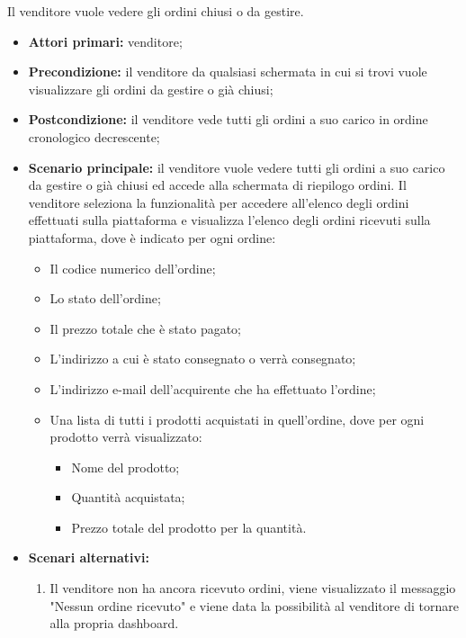 \label{visualizzazione-ordini-in-gestione}

Il venditore vuole vedere gli ordini chiusi o da gestire.
\begin{itemize}
    \item \textbf{Attori primari:} venditore;
    \item \textbf{Precondizione:} il venditore da qualsiasi schermata in cui si trovi vuole visualizzare gli ordini da gestire o già chiusi;
    \item \textbf{Postcondizione:} il venditore vede tutti gli ordini a suo carico in ordine cronologico decrescente;
    \item \textbf{Scenario principale:} il venditore vuole vedere tutti gli ordini a suo carico da gestire o già chiusi ed accede alla schermata di riepilogo ordini. Il venditore seleziona la funzionalità per accedere all'elenco degli ordini effettuati sulla piattaforma e visualizza l'elenco degli ordini ricevuti sulla piattaforma, dove è indicato per ogni ordine:
    \begin{itemize}
    	\item Il codice numerico dell'ordine;
    	\item Lo stato dell'ordine;
    	\item Il prezzo totale che è stato pagato;
    	\item L'indirizzo a cui è stato consegnato o verrà consegnato;
    	\item L'indirizzo e-mail dell'acquirente che ha effettuato l'ordine;
    	\item Una lista di tutti i prodotti acquistati in quell'ordine, dove per ogni prodotto verrà visualizzato:
    	\begin{itemize}
    		\item Nome del prodotto;
    		\item Quantità acquistata;
    		\item Prezzo totale del prodotto per la quantità.
    	\end{itemize}
    \end{itemize}
	\item \textbf{Scenari alternativi:} 
	\begin{enumerate}[label=\lett]
		\item Il venditore non ha ancora ricevuto ordini, viene visualizzato il messaggio "Nessun ordine ricevuto" e viene data la possibilità al venditore di tornare alla propria dashboard.
	\end{enumerate}
\end{itemize}

